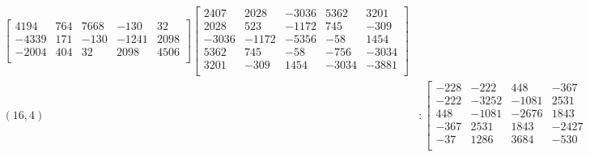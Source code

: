 \documentclass[12pt]{amsart}
\theoremstyle{plain}
\theoremstyle{definition}
\begin{document}
\begin{landscape}
\begin{align*}
\begin{bmatrix}
 4194  &   764  &   7668  &   -130  &   32  \\ 
 -4339  &   171  &   -130  &   -1241  &   2098  \\ 
 -2004  &   404  &   32  &   2098  &   4506  \\ 
\end{bmatrix}
\begin{bmatrix}
2407  &   2028  &   -3036  &   5362  &   3201  \\ 
 2028  &   523  &   -1172  &   745  &   -309  \\ 
 -3036  &   -1172  &   -5356  &   -58  &   1454  \\ 
 5362  &   745  &   -58  &   -756  &   -3034  \\ 
 3201  &   -309  &   1454  &   -3034  &   -3881  \\ 
\end{bmatrix}
\\
(16,4) &:
\begin{bmatrix}
-228  &   -222  &   448  &   -367  &   -37  \\ 
 -222  &   -3252  &   -1081  &   2531  &   1286  \\ 
 448  &   -1081  &   -2676  &   1843  &   3684  \\ 
 -367  &   2531  &   1843  &   -2427  &   -530  \\ 
 -37  &   1286  &   3684  &   -530  &   -4654  \\ 
\end{bmatrix}
\begin{bmatrix}
-301  &   714  &   -1325  &   -1631  &   -839  \\ 
 714  &   -2195  &   707  &   4493  &   397  \\ 
 -1325  &   707  &   565  &   1832  &   25  \\ 
 -1631  &   4493  &   1832  &   -389  &   1330  \\ 
 -839  &   397  &   25  &   1330  &   157  \\ 
\end{bmatrix}
\begin{bmatrix}
-402  &   -270  &   892  &   -669  &   -49  \\ 
 -270  &   425  &   -79  &   -94  &   790  \\ 
 892  &   -79  &   -2457  &   3159  &   1164  \\ 
 -669  &   -94  &   3159  &   -1628  &   -1074  \\ 
 -49  &   790  &   1164  &   -1074  &   -364  \\ 
\end{bmatrix}

\end{align*}
\end{landscape}
\end{document}
